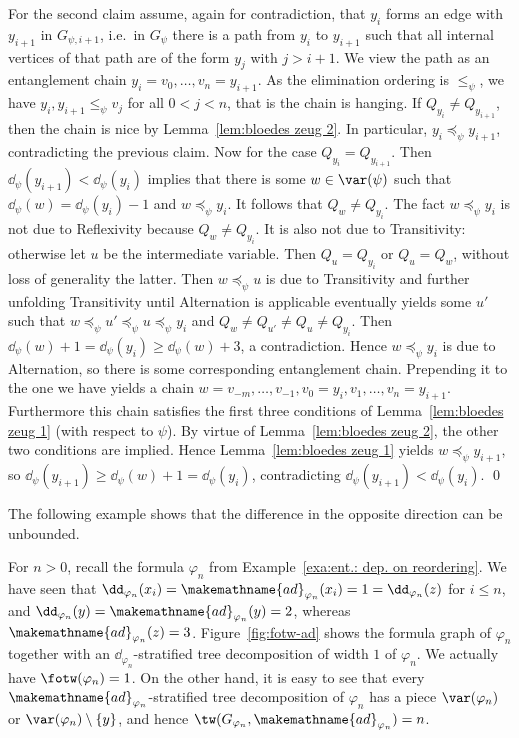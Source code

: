 \documentclass{LMCS}
\renewcommand{\phi}{\varphi}
\newcommand{\refl}{Reflexivity}
\newcommand{\trans}{Transitivity}
\newcommand{\alt}{Alternation}
\newcommand{\alte}{\makemathname{ad}}
\begin{document}
For the second claim assume, again for contradiction, 
that $y_i$ forms an edge with $y_{i+1}$ in $G_{\psi,i+1}$, 
i.e.~in $G_{\psi}$ there is a path from $y_i$ to $y_{i+1}$ 
such that all internal vertices of that path 
are of the form $y_j$ with $j>i+1$. 
We view the path as an entanglement chain $y_i=v_0,\ldots,v_n=y_{i+1}$. 
As the elimination ordering is $\leq_{\psi}$, 
we have $y_i,y_{i+1}\leq_{\psi}v_j$ for all $0<j<n$, 
that is the chain is hanging. 
If $Q_{y_i}\not=Q_{y_{i+1}}$, 
then the chain is nice by Lemma~\ref{lem:bloedes zeug 2}. 
In particular, $y_i\preceq_{\psi}y_{i+1}$, contradicting the previous claim. 
Now for the case $Q_{y_i}=Q_{y_{i+1}}$. 
Then $\dd_{\psi}(y_{i+1})<\dd_{\psi}(y_i)$ implies that there is some $w\in\var(\psi)$ 
such that $\dd_{\psi}(w)=\dd_{\psi}(y_i)-1$ and $w\preceq_{\psi}y_i$. 
It follows that $Q_w\not=Q_{y_i}$. 
The fact $w\preceq_{\psi}y_i$ is not due to \refl{} because $Q_w\not=Q_{y_i}$. 
It is also not due to \trans: 
otherwise let $u$ be the intermediate variable. 
Then $Q_u=Q_{y_i}$ or $Q_u=Q_w$, without loss of generality the latter. 
Then $w\preceq_{\psi}u$ is due to \trans{} 
and further unfolding \trans{} until \alt{} is applicable 
eventually yields some $u'$ 
such that $w\preceq_{\psi}u'\preceq_{\psi}u\preceq_{\psi}y_i$ 
and $Q_w\not=Q_{u'}\not=Q_u\not=Q_{y_i}$. 
Then $\dd_{\psi}(w)+1=\dd_{\psi}(y_i)\geq\dd_{\psi}(w)+3$, a contradiction. 
Hence $w\preceq_{\psi}y_i$ is due to \alt, 
so there is some corresponding entanglement chain. 
Prepending it to the one we have 
yields a chain $w=v_{-m},\ldots,v_{-1},v_0=y_i,v_1,\ldots,v_n=y_{i+1}$. 
Furthermore this chain satisfies the first three conditions 
of Lemma~\ref{lem:bloedes zeug 1} (with respect to $\psi$). 
By virtue of Lemma~\ref{lem:bloedes zeug 2}, 
the other two conditions are implied. 
Hence Lemma~\ref{lem:bloedes zeug 1} yields $w\preceq_{\psi}y_{i+1}$, 
so $\dd_{\psi}(y_{i+1})\geq\dd_{\psi}(w)+1=\dd_{\psi}(y_i)$, 
contradicting $\dd_{\psi}(y_{i+1})<\dd_{\psi}(y_i)$. 
\qed


The following example shows that the difference in the opposite
direction can be unbounded.

\begin{exa}\label{ex:fotw-ad}
For $n>0$, 
recall the formula $\phi_n$ from Example~\ref{exa:ent.: dep. on reordering}. 
We have seen that $\dd_{\phi_n}(x_i)=\alte_{\phi_n}(x_i)=1=\dd_{\phi_n}(z)$ 
for $i\leq n$, 
and $\dd_{\phi_n}(y)=\alte_{\phi_n}(y)=2$, 
whereas $\alte_{\phi_n}(z)=3$. 
Figure~\ref{fig:fotw-ad} shows the formula graph of $\phi_n$ 
together with an $\dd_{\phi_n}$-stratified tree decomposition of width $1$ of $\phi_n$.
We actually have $\fotw(\phi_n)= 1$. 
On the other hand, it is easy to see 
that every $\alte_{\phi_n}$-stratified tree decomposition of $\phi_n$ 
has a piece $\var(\phi_n)$ or $\var(\phi_n)\setminus\{y\}$, 
and hence $\tw(G_{\phi_n},\alte_{\phi_n})=n$. 
\end{exa}
\end{document}
